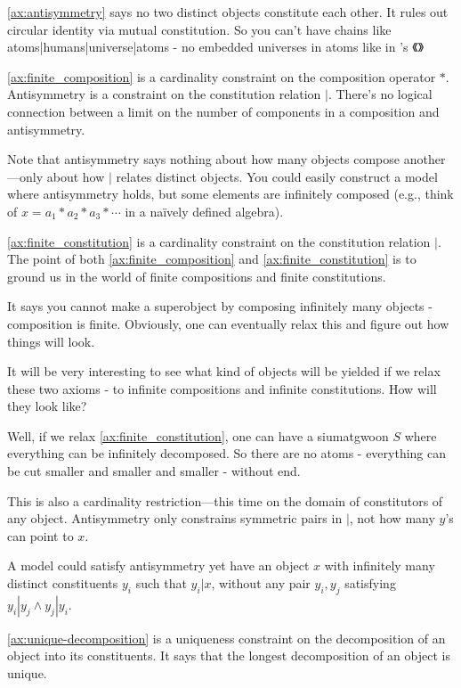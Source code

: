 \ref{ax:antisymmetry} says no two distinct objects constitute each other. It rules out circular identity via mutual constitution. So you can't have chains like atoms|humans|universe|atoms - no embedded universes in atoms like in 's 《》 

\ref{ax:finite_composition} is a cardinality constraint on the composition operator $*$. Antisymmetry is a constraint on the constitution relation $|$. There's no logical connection between a limit on the number of components in a composition and antisymmetry.

Note that antisymmetry says nothing about how many objects compose another—only about how $|$ relates distinct objects. You could easily construct a model where antisymmetry holds, but some elements are infinitely composed (e.g., think of $x = a_1 * a_2 * a_3 * \cdots$ in a naïvely defined algebra).

\ref{ax:finite_constitution} is a cardinality constraint on the constitution relation $|$. The point of both \ref{ax:finite_composition} and \ref{ax:finite_constitution} is to ground us in the world of finite compositions and finite constitutions. 

It says you cannot make a superobject by composing infinitely many objects - composition is finite. Obviously, one can eventually relax this and figure out how things will look.

It will be very interesting to see what kind of objects will be yielded if we relax these two axioms - to infinite compositions and infinite constitutions. How will they look like?

Well, if we relax \ref{ax:finite_constitution}, one can have a siumatgwoon $S$ where everything can be infinitely decomposed. So there are no atoms - everything can be cut smaller and smaller and smaller - without end.

This is also a cardinality restriction—this time on the domain of constitutors of any object. Antisymmetry only constrains symmetric pairs in $|$, not how many $y$'s can point to $x$.

A model could satisfy antisymmetry yet have an object $x$ with infinitely many distinct constituents $y_i$ such that $y_i|x$, without any pair $y_i, y_j$ satisfying $y_i|y_j \wedge y_j|y_i$.

\ref{ax:unique-decomposition} is a uniqueness constraint on the decomposition of an object into its constituents. It says that the longest decomposition of an object is unique.

